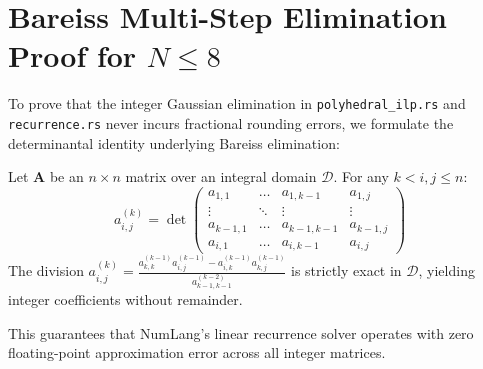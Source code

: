 \section{Bareiss Multi-Step Elimination Proof for $N \le 8$}
\label{sec:rec:bareiss_proof}

To prove that the integer Gaussian elimination in \texttt{polyhedral\_ilp.rs} and \texttt{recurrence.rs} never incurs fractional rounding errors, we formulate the determinantal identity underlying Bareiss elimination:

\begin{theorem}
Let $\mathbf{A}$ be an $n \times n$ matrix over an integral domain $\mathcal{D}$. For any $k < i, j \le n$:
\begin{equation}
a_{i,j}^{(k)} = \det \begin{pmatrix}
a_{1,1} & \dots & a_{1,k-1} & a_{1,j} \\
\vdots & \ddots & \vdots & \vdots \\
a_{k-1,1} & \dots & a_{k-1,k-1} & a_{k-1,j} \\
a_{i,1} & \dots & a_{i,k-1} & a_{i,j}
\end{pmatrix}
\end{equation}
The division $a_{i,j}^{(k)} = \frac{a_{k,k}^{(k-1)} a_{i,j}^{(k-1)} - a_{i,k}^{(k-1)} a_{k,j}^{(k-1)}}{a_{k-1,k-1}^{(k-2)}}$ is strictly exact in $\mathcal{D}$, yielding integer coefficients without remainder.
\end{theorem}
This guarantees that NumLang's linear recurrence solver operates with zero floating-point approximation error across all integer matrices.

